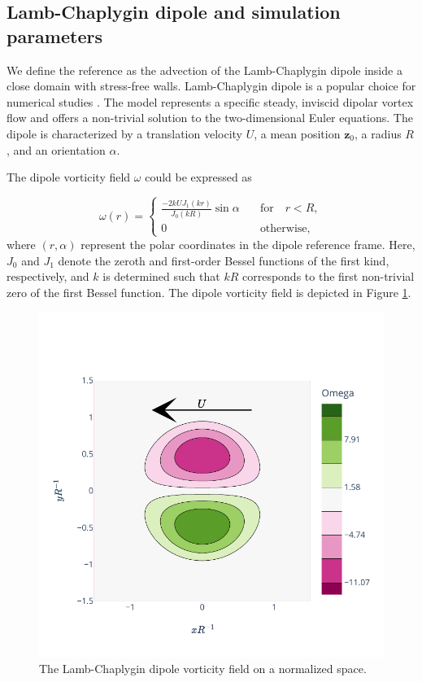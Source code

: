 \subsection{Lamb-Chaplygin dipole and simulation parameters}

We define the reference as the advection of the Lamb-Chaplygin dipole inside a close domain with stress-free walls. Lamb-Chaplygin dipole is a popular choice for numerical studies \cite{orlandi_vortex_1990}. The model represents a specific steady, inviscid dipolar vortex flow and offers a non-trivial solution to the two-dimensional Euler equations. The dipole is characterized by a translation velocity $U$, a mean position $\bm{z}_0$, a radius $R$, and an orientation $\alpha$.

The dipole vorticity field $\omega$ could be expressed as

\begin{equation*}
	\omega(r) = \begin{cases}
		\frac{-2 k U J_1(kr)}{J_0(kR)} \sin \alpha \quad & \text{for} \quad  r < R, \\
		0 \quad                                          & \text{otherwise},
	\end{cases}
\end{equation*}where $(r, \alpha)$ represent the polar coordinates in the dipole reference frame. Here, $J_0$ and $J_1$ denote the zeroth and first-order Bessel functions of the first kind, respectively, and $k$ is determined such that $kR$ corresponds to the first non-trivial zero of the first Bessel function. The dipole vorticity field is depicted in Figure \ref{fig:lamb_dipole}.

\begin{figure}[ht]
	\centering
	\includegraphics[width=0.6\linewidth]{images/app2d/lamb.pdf}
	\caption{The Lamb-Chaplygin dipole vorticity field on a normalized space.}
	\label{fig:lamb_dipole}
\end{figure}

